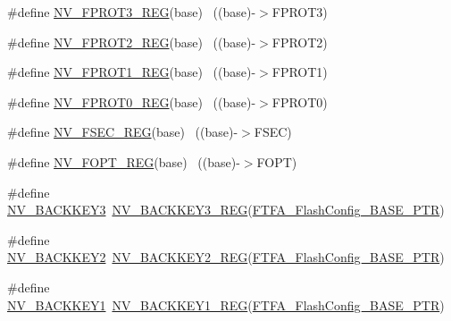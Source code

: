 \begin{DoxyCompactItemize}
\item 
\#define \hyperlink{group___n_v___register___accessor___macros_gad8e367bb2e9aae8570a3736ec8a4aee9}{N\+V\+\_\+\+F\+P\+R\+O\+T3\+\_\+\+R\+EG}(base)                                        ~((base)-\/$>$F\+P\+R\+O\+T3)
\item 
\#define \hyperlink{group___n_v___register___accessor___macros_gae06ab638a7b4ad4757c89118971127d0}{N\+V\+\_\+\+F\+P\+R\+O\+T2\+\_\+\+R\+EG}(base)                                        ~((base)-\/$>$F\+P\+R\+O\+T2)
\item 
\#define \hyperlink{group___n_v___register___accessor___macros_ga1f9fafcb15ed5d1b27020f5b04edfe00}{N\+V\+\_\+\+F\+P\+R\+O\+T1\+\_\+\+R\+EG}(base)                                        ~((base)-\/$>$F\+P\+R\+O\+T1)
\item 
\#define \hyperlink{group___n_v___register___accessor___macros_ga04dc6fb630cffc56b5fff1847704cc53}{N\+V\+\_\+\+F\+P\+R\+O\+T0\+\_\+\+R\+EG}(base)                                        ~((base)-\/$>$F\+P\+R\+O\+T0)
\item 
\#define \hyperlink{group___n_v___register___accessor___macros_gafcfd540f11abf7f4644b7c5a5bc272fe}{N\+V\+\_\+\+F\+S\+E\+C\+\_\+\+R\+EG}(base)                                            ~((base)-\/$>$F\+S\+EC)
\item 
\#define \hyperlink{group___n_v___register___accessor___macros_ga66cb061090c7bd7c8b2447b133a93ce5}{N\+V\+\_\+\+F\+O\+P\+T\+\_\+\+R\+EG}(base)                                            ~((base)-\/$>$F\+O\+PT)
\item 
\#define \hyperlink{group___n_v___register___accessor___macros_ga18932af5b184d02998db112b364e45e1}{N\+V\+\_\+\+B\+A\+C\+K\+K\+E\+Y3}~\hyperlink{group___n_v___register___accessor___macros_ga3f3d8bddafcafafb27fb8981656492e1}{N\+V\+\_\+\+B\+A\+C\+K\+K\+E\+Y3\+\_\+\+R\+EG}(\hyperlink{group___n_v___peripheral_ga3458652dfc38239f92682556e63596b5}{F\+T\+F\+A\+\_\+\+Flash\+Config\+\_\+\+B\+A\+S\+E\+\_\+\+P\+TR})
\item 
\#define \hyperlink{group___n_v___register___accessor___macros_ga51642a3d84acba43ff0aa3925226ab32}{N\+V\+\_\+\+B\+A\+C\+K\+K\+E\+Y2}~\hyperlink{group___n_v___register___accessor___macros_gaad90d55fc5c046a8e8508b04cbe2fbbb}{N\+V\+\_\+\+B\+A\+C\+K\+K\+E\+Y2\+\_\+\+R\+EG}(\hyperlink{group___n_v___peripheral_ga3458652dfc38239f92682556e63596b5}{F\+T\+F\+A\+\_\+\+Flash\+Config\+\_\+\+B\+A\+S\+E\+\_\+\+P\+TR})
\item 
\#define \hyperlink{group___n_v___register___accessor___macros_gae849f8e6eaa76305b07c567463074dc9}{N\+V\+\_\+\+B\+A\+C\+K\+K\+E\+Y1}~\hyperlink{group___n_v___register___accessor___macros_gaa618f324e87cf548f4736270e46fcc57}{N\+V\+\_\+\+B\+A\+C\+K\+K\+E\+Y1\+\_\+\+R\+EG}(\hyperlink{group___n_v___peripheral_ga3458652dfc38239f92682556e63596b5}{F\+T\+F\+A\+\_\+\+Flash\+Config\+\_\+\+B\+A\+S\+E\+\_\+\+P\+TR})

\end{DoxyCompactItemize}
